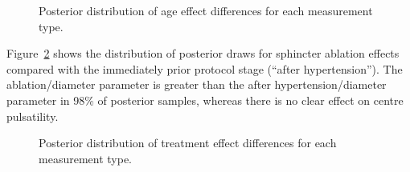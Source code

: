 \documentclass[
  letterpaper,
  DIV=11,
  numbers=noendperiod,
  oneside]{scrartcl}
\theoremstyle{plain}
\theoremstyle{remark}
\begin{document}
\begin{figure}


\caption{\label{fig-pulsatility-age-effects}Posterior distribution of
age effect differences for each measurement type.}

\end{figure}%

Figure~\ref{fig-pulsatility-treatment-effects} shows the distribution of
posterior draws for sphincter ablation effects compared with the
immediately prior protocol stage (``after hypertension''). The
ablation/diameter parameter is greater than the after
hypertension/diameter parameter in 98\% of posterior samples, whereas
there is no clear effect on centre pulsatility.

\begin{figure}


\caption{\label{fig-pulsatility-treatment-effects}Posterior distribution
of treatment effect differences for each measurement type.}

\end{figure}%
\end{document}
